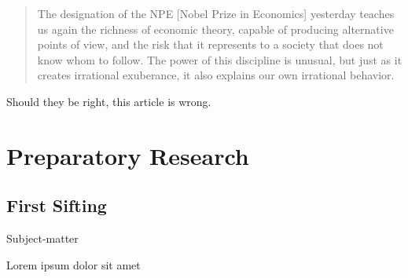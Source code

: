 \documentclass[paper=B6,portrait,twoside=true,twocolumn=false,headinclude=true,footinclude=false,fontsize=12,BCOR=10mm,DIV=calc,pagesize=auto,titlepage=firstiscover,mpinclude=false,headings=normal,headings=twolinechapter,open=right,toc=graduated,chapterprefix=false,numbers=endperiod,parskip=half+]{scrbook}
\theoremstyle{definition}
\begin{document}
\blockcquote{Alvarez2013}{The designation of the NPE [Nobel Prize in Economics] yesterday teaches us again the richness of economic theory, capable of producing  alternative points of view, and the risk that it represents to a society that does not know whom to follow. The power of this discipline is unusual, but just as it creates irrational exuberance, it also explains our own irrational behavior.}

Should they be right, this article is wrong. 

\mainmatter
\pagestyle{scrheadings}
\part{Preparatory Research}
\label{sec:orgbdbf277}
\chapter{First Sifting}
\label{sec:org8c4c0cd}
   \begin{labeling}[~]{Subject-matter} 
\item[Subject-matter] Lorem ipsum dolor sit amet
\end{labeling}
\end{document}
